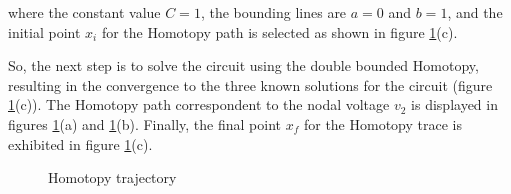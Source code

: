 \documentclass[conference,letterpaper,onecolumn]{IEEEtran}
\begin{document}
where the constant value $C=1$, the bounding lines are $a=0$ and $b=1$, and the initial point $x_i$ for the Homotopy path is selected as shown in figure \ref{yamaie}(c).

So, the next step is to solve the circuit using the double bounded Homotopy, resulting in the convergence to the three known solutions for the circuit (figure \ref{yamaie}(c)). The Homotopy path correspondent to the nodal voltage $v_2$ is displayed in figures \ref{yamaie}(a) and \ref{yamaie}(b). Finally, the final point $x_f$ for the Homotopy trace is exhibited in figure \ref{yamaie}(c).




\begin{figure}[hbtp]
\centerline{
\epsfxsize=105mm
}
\caption{Homotopy trajectory}
\label{yamaie}
\end{figure}


\begin{table}[hbtp]
{\small
{}
}
\caption{Operating points (solutions) for figure \ref{yamamuracircuito}. at $\lambda_1=1$ and $\lambda_2=1$}
\label{yamamuracircuitosoluc}
\end{table}
\end{document}
